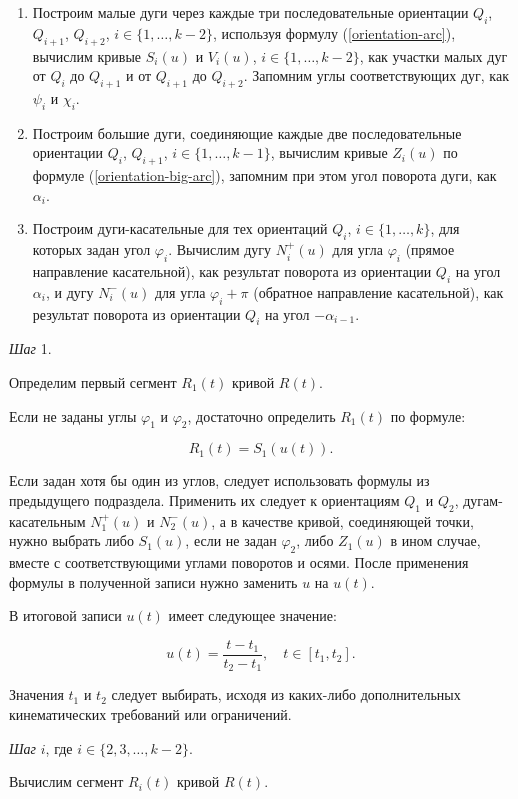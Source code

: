 \begin{enumerate}
\item Построим малые дуги через каждые три последовательные ориентации $Q_i$, $Q_{i+1}$, $Q_{i+2}$,
$i \in \{1,\dots,k-2\}$, используя формулу (\ref{orientation-arc}), вычислим кривые $S_i(u)$ и $V_i(u)$,
$i \in \{1,\dots,k-2\}$, как участки малых дуг от $Q_i$ до $Q_{i+1}$ и от $Q_{i+1}$ до $Q_{i+2}$. Запомним углы
соответствующих дуг, как $\psi_i$ и $\chi_i$.
\item Построим большие дуги, соединяющие каждые две последовательные ориентации $Q_i$, $Q_{i+1}$, $i \in \{1,\dots,k-1\}$,
вычислим кривые $Z_i(u)$ по формуле (\ref{orientation-big-arc}), запомним при этом угол поворота дуги, как $\alpha_i$.
\item Построим дуги-касательные для тех ориентаций $Q_i$, $i \in \{1,\dots,k\}$, для которых задан угол $\varphi_i$.
Вычислим дугу $N_i^+(u)$ для угла $\varphi_i$ (прямое направление касательной), как результат поворота из ориентации $Q_i$
на угол $\alpha_i$, и дугу $N_i^-(u)$ для угла $\varphi_i+\pi$ (обратное направление касательной), как результат поворота
из ориентации $Q_i$ на угол $-\alpha_{i-1}$.
\end{enumerate}

\bigskip
\textit{Шаг} 1.

Определим первый сегмент $R_1(t)$ кривой $R(t)$.

Если не заданы углы $\varphi_1$ и $\varphi_2$, достаточно определить $R_1(t)$ по формуле:

$$
R_1(t)=S_1(u(t)).
$$

Если задан хотя бы один из углов, следует использовать формулы из предыдущего подраздела. Применить их следует к
ориентациям $Q_1$ и $Q_2$, дугам-касательным $N_1^+(u)$ и $N_2^-(u)$, а в качестве кривой, соединяющей точки, нужно
выбрать либо $S_1(u)$, если не задан $\varphi_2$, либо $Z_1(u)$ в ином случае, вместе с соответствующими углами
поворотов и осями. После применения формулы в полученной записи нужно заменить $u$ на $u(t)$.

В итоговой записи $u(t)$ имеет следующее значение:

$$
u(t)=\frac{t-t_1}{t_2-t_1}, \quad t \in [t_1,t_2].
$$

Значения $t_1$ и $t_2$ следует выбирать, исходя из каких-либо дополнительных кинематических требований или ограничений.

\bigskip
\textit{Шаг} $i$, где $i \in \{2,3,\dots,k-2\}$.

Вычислим сегмент $R_i(t)$ кривой $R(t)$.

